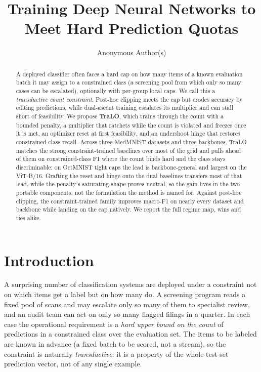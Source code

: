 \documentclass[letterpaper]{article} %
\title{Training Deep Neural Networks to Meet Hard Prediction Quotas}
\author{Anonymous Author(s)}
\begin{document}
\maketitle

\begin{abstract}
A deployed classifier often faces a hard cap on how many items of a known evaluation
batch it may assign to a constrained class (a screening pool from which only so many
cases can be escalated), optionally with per-group local caps. We call this a
\emph{transductive count constraint}. Post-hoc clipping meets the cap but erodes accuracy
by editing predictions, while dual-ascent training escalates its multiplier and can stall
short of feasibility. We propose \textbf{TraLO}, which trains through the count with a
bounded penalty, a multiplier that ratchets while the count is violated and freezes once
it is met, an optimizer reset at first feasibility, and an undershoot hinge that restores
constrained-class recall. Across three MedMNIST datasets and three backbones, TraLO
matches the strong constraint-trained baselines over most of the grid and pulls ahead
of them on constrained-class F1 where the count binds hard and the class stays
discriminable: on OctMNIST tight caps the lead is backbone-general and largest on the
ViT-B/16. Grafting the reset and hinge onto the dual baselines transfers most of that
lead, while the penalty's saturating shape proves neutral, so the gain lives in the two
portable components, not the formulation the method is named for. Against post-hoc
clipping, the constraint-trained family improves macro-F1 on nearly every dataset and
backbone while landing on the cap natively. We report the full regime map, wins and ties
alike.
\end{abstract}

\section{Introduction}

A surprising number of classification systems are deployed under a constraint not
on which items get a label but on how many do. A screening program reads a fixed pool
of scans and may escalate only so many of them to specialist review, and an audit team
can act on only so many flagged filings in a quarter. In each case the operational requirement is a
\emph{hard upper bound on the count} of predictions in a constrained class over the
evaluation set. The items to be labeled are known in advance (a fixed batch to be
scored, not a stream), so the
constraint is naturally \emph{transductive}: it is a property of the whole test-set
prediction vector, not of any single example.
\end{document}
